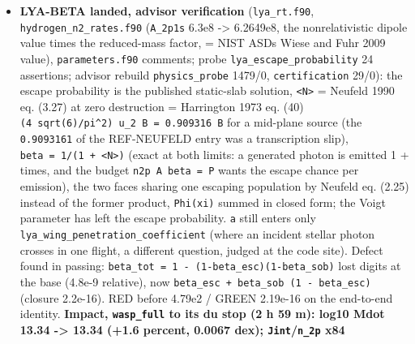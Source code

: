 \documentclass[english,a4paper]{my_memo}
\begin{document}
\begin{itemize}
  0.030/0.050/0.078/0.140/0.163/0.340; Table 5 effective L1/L2 yields
  (Coster-Kronig included per the text, nu\_3 = omega\_3) for Mg to Fe all
  below 6.5e-3; Table 2 uncertainties (omega\_K 40-10 percent at Z 5-10,
  footnote (a) on molecules and solids). With \texttt{e\_top} = 1240 eV only C, N,
  O and Na I can hold a K hole, so the neglected radiative branch is at most
  2.3 percent of a K-hole event (under 1 percent for the three coolants) and
  under 0.7 percent of any L-shell event; raising \texttt{e\_top} past 1.3 keV (Mg,
  Si K) or 4 keV (Ca, Fe K) is the condition under which the approximation
  must be revisited, stated at the code site, in \texttt{photoion\_cross\_sections.tex}
  (new \texttt{tab:kedge}), \texttt{code\_status} and decision item 7.
\item
  \textbf{LYA-BETA landed, advisor verification} (\texttt{lya\_rt.f90}, \texttt{hydrogen\_n2\_rates.f90}
  (\texttt{A\_2p1s} 6.3e8 -\textgreater{} 6.2649e8, the nonrelativistic dipole value times the
  reduced-mass factor, = NIST ASD\textquotesingle s Wiese and Fuhr 2009 value),
  \texttt{parameters.f90} comments; probe \texttt{lya\_escape\_probability} 24 assertions;
  advisor rebuild \texttt{physics\_probe} 1479/0, \texttt{certification} 29/0): the
  escape probability is the published static-slab solution, \texttt{\textless{}N\textgreater{}} =
  Neufeld 1990 eq. (3.27) at zero destruction = Harrington 1973 eq. (40)
  \texttt{(4\ sqrt(6)/pi\^{}2)\ u\_2\ B\ =\ 0.909316\ B} for a mid-plane source (the
  \texttt{0.9093161} of the REF-NEUFELD entry was a transcription slip), \texttt{beta\ =\ 1/(1\ +\ \textless{}N\textgreater{})} (exact at both limits: a generated photon is emitted 1 +
  times, and the budget \texttt{n2p\ A\ beta\ =\ P} wants the escape chance per
  emission), the two faces sharing one escaping population by Neufeld eq.
  (2.25) instead of the former product, \texttt{Phi(xi)} summed in closed form; the
  Voigt parameter has left the escape probability. \texttt{a} still enters only
  \texttt{lya\_wing\_penetration\_coefficient} (where an incident stellar photon
  crosses in one flight, a different question, judged at the code site).
  Defect found in passing: \texttt{beta\_tot\ =\ 1\ -\ (1-beta\_esc)(1-beta\_sob)} lost
  digits at the base (4.8e-9 relative), now \texttt{beta\_esc\ +\ beta\_sob\ (1\ -\ beta\_esc)} (closure 2.2e-16). RED before 4.79e2 / GREEN 2.19e-16 on the
  end-to-end identity. \textbf{Impact, \texttt{wasp\_full} to its du stop (2 h 59 m):
  log10 Mdot 13.34 -\textgreater{} 13.34 (+1.6 percent, 0.0067 dex); \texttt{Jint}/\texttt{n\_2p} x84
}
\end{itemize}
\end{document}
